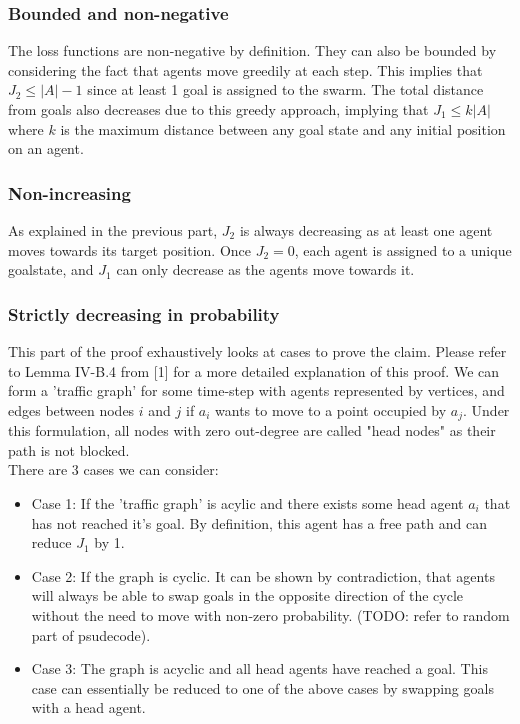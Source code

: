 \subsubsection{Bounded and non-negative} The loss functions are non-negative by definition. They can also be bounded by considering the fact that agents move greedily at each step. This implies that $J_2 \leq |A| - 1$ since at least 1 goal is assigned to the swarm. The total distance from goals also decreases due to this greedy approach, implying that $J_1 \leq k|A|$ where $k$ is the maximum distance between any goal state and any initial position on an agent.

\subsubsection{Non-increasing} As explained in the previous part, $J_2$ is always decreasing as at least one agent moves towards its target position. Once $J_2 = 0$, each agent is assigned to a unique goalstate, and $J_1$ can only decrease as the agents move towards it.

\subsubsection{Strictly decreasing in probability} This part of the proof exhaustively looks at cases to prove the claim. Please refer to Lemma IV-B.4 from [1] for a more detailed explanation of this proof. We can form a 'traffic graph' for some time-step with agents represented by vertices, and edges between nodes $i$ and $j$ if $a_i$ wants to move to a point occupied by $a_j$. Under this formulation, all nodes with zero out-degree are called "head nodes" as their path is not blocked. 
\\ 
There are 3 cases we can consider:
\begin{itemize}
    \item Case 1: If the 'traffic graph' is acylic and there exists some head agent $a_i$ that has not reached it's goal. By definition, this agent has a free path and can reduce $J_{1}$ by 1.
    \item Case 2: If the graph is cyclic. It can be shown by contradiction, that agents will always be able to swap goals in the opposite direction of the cycle without the need to move with non-zero probability. (TODO: refer to random part of psudecode).
    \item Case 3: The graph is acyclic and all head agents have reached a goal. This case can essentially be reduced to one of the above cases by swapping goals with a head agent.
\end{itemize}

